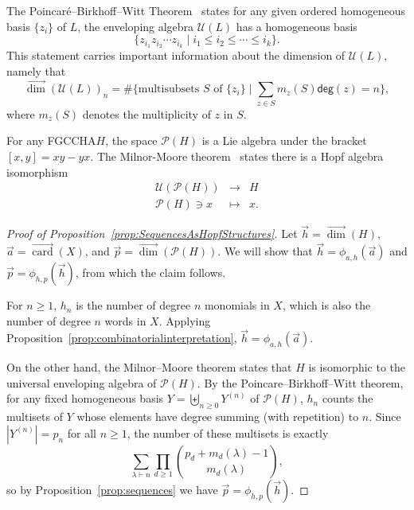\documentclass[11pt]{amsart}
\theoremstyle{definition}
\numberwithin{equation}{section}
\newcommand{\FGCCHA}{\textsf{FGCCHA}\xspace}
\newcommand{\vecdim}{\overrightarrow{\dim}}
\newcommand{\veccard}{\overrightarrow{\operatorname{card}}}
\begin{document}
The Poincar\'{e}--Birkhoff--Witt Theorem~\cite[\S 0.1]{Reutenauer-FreeLieAlgebras}
states for any given ordered homogeneous basis $\{z_i\}$ of $L$,
the enveloping algebra $\mathcal{U}(L)$ has a homogeneous basis
\[
\{ z_{i_1}z_{i_2}\cdots z_{i_k} \;|\; i_1 \leq i_2 \leq \cdots \leq i_k\}.
\]
This statement carries important information about the dimension of $\mathcal{U}(L)$, namely that 
\[
\vecdim(\mathcal{U}(L))_{n}= \#\{\text{multisubsets $S$ of $\{z_{i}\}$} \;|\; \sum_{z \in S} m_{z}(S) \mathsf{deg}(z) = n\},
\]
where $m_{z}(S)$ denotes the multiplicity of $z$ in $S$.

For any \FGCCHA $H$, the space $\mathcal{P}(H)$ is a Lie algebra under the bracket $[x, y] = xy - yx$.  
The Milnor-Moore theorem~\cite[Theorem 5.18]{MM65} states there is a Hopf algebra isomorphism
\[
\begin{array}{rcl}
\mathcal{U}(\mathcal{P}(H)) &\to& H \\
\mathcal{P}(H) \ni x & \mapsto&  x.
\end{array}
\]

\begin{proof}[Proof of Proposition~\ref{prop:SequencesAsHopfStructures}]
Let $\vec{h} = \vecdim(H)$, $\vec{a} = \veccard(X)$, and $\vec{p} = \vecdim(\mathcal{P}(H))$.  We will show that $\vec{h} = \phi_{a, h}(\vec{a})$ and $\vec{p} = \phi_{h, p}(\vec{h})$, from which the claim follows.  

For $n \ge 1$, $h_{n}$ is the number of degree $n$ monomials in $X$, which is also the number of degree $n$ words in $X$.  
Applying Proposition~\ref{prop:combinatorialinterpretation}, $\vec{h} = \phi_{a, h}(\vec{a})$.

On the other hand, the Milnor--Moore theorem states that $H$ is
isomorphic to the universal enveloping algebra of $\mathcal{P}(H)$.
By the Poincare--Birkhoff--Witt theorem, for any fixed homogeneous basis
$Y = \biguplus_{n \ge 0} Y^{(n)}$ of $\mathcal{P}(H)$, $h_{n}$ counts
the multisets of $Y$ whose elements have degree summing (with repetition)
to $n$.  Since $|Y^{(n)}| = p_{n}$ for all $n \ge 1$, the number of these
multisets is exactly
\[
\sum_{\lambda \vdash n} \prod_{d \geq 1} \binom{p_d + m_d(\lambda) -1}{m_d(\lambda)},
\]
so by Proposition~\ref{prop:sequences} we have $\vec{p} = \phi_{h, p}(\vec{h})$.
\end{proof}
\end{document}
